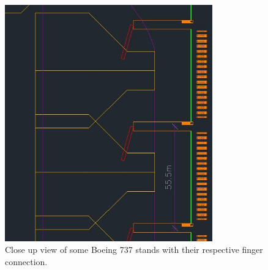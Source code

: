 	\begin{figure}[H]
		\centering
		\includegraphics[clip, trim=0cm 0cm 0cm 0cm, angle=270, width=0.8\textwidth]{./images/serviceway/fingercloseup}
		\caption{Close up view of some Boeing 737 stands with their respective finger connection.} %
		\label{} %
	\end{figure} 